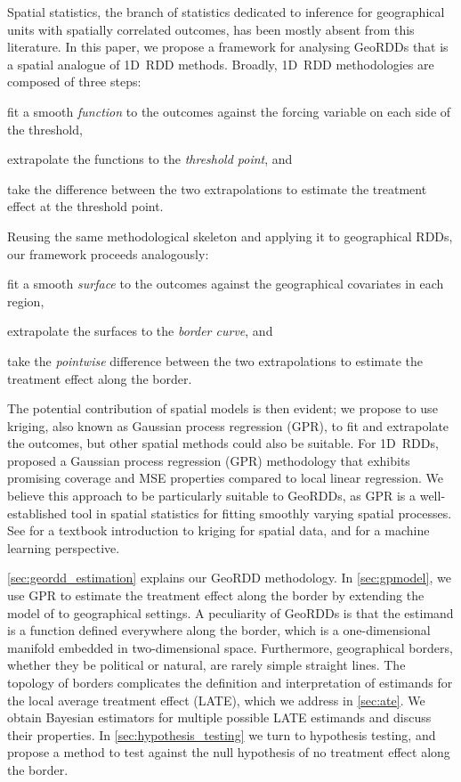 Spatial statistics, the branch of statistics dedicated to inference for geographical units with spatially correlated outcomes, has been mostly absent from this literature.
In this paper, we propose a framework for analysing GeoRDDs that is a spatial analogue of 1D~RDD methods.
Broadly, 1D~RDD methodologies \citep{imbensrdd} are composed of three steps:
\begin{flatlist}
    \item
        fit a smooth \emph{function} to the outcomes against the forcing variable on each side of the threshold,
    \item
        extrapolate the functions to the \emph{threshold point}, and
    \item
        take the difference between the two extrapolations to estimate the treatment effect at the threshold point.
\end{flatlist}
Reusing the same methodological skeleton and applying it to geographical RDDs, our framework proceeds analogously:
\begin{flatlist}
    \item
        fit a smooth \emph{surface} to the outcomes against the geographical covariates in each region,
    \item
        extrapolate the surfaces to the \emph{border curve}, and
    \item
        take the \emph{pointwise} difference between the two extrapolations to estimate the treatment effect along the border.
\end{flatlist}
\label{sec:framework}
The potential contribution of spatial models is then evident;
we propose to use kriging, also known as Gaussian process regression (GPR), to fit and extrapolate the outcomes, 
but other spatial methods could also be suitable.
For 1D~RDDs, \cite{Branson:2017qy} proposed a Gaussian process regression (GPR) methodology that exhibits promising coverage and MSE properties compared to local linear regression.
We believe this approach to be particularly suitable to GeoRDDs, as GPR is a well-established tool in spatial statistics for fitting smoothly varying spatial processes.
See \cite{banerjee2014hierarchical} for a textbook introduction to kriging for spatial data, and \cite{rasmussen2006gaussian} for a machine learning perspective.

\autoref{sec:geordd_estimation} explains our GeoRDD methodology.
In \autoref{sec:gpmodel}, we use GPR to estimate the treatment effect along the border by extending the model of \cite{Branson:2017qy} to geographical settings.
A peculiarity of GeoRDDs is that the estimand is a function defined everywhere along the border, which is a one-dimensional manifold embedded in two-dimensional space.
Furthermore, geographical borders, whether they be political or natural, are rarely simple straight lines.
The topology of borders complicates the definition and interpretation of estimands for the local average treatment effect (LATE), which we address in \autoref{sec:ate}.
We obtain Bayesian estimators for multiple possible LATE estimands and discuss their properties.
In \autoref{sec:hypothesis_testing} we turn to hypothesis testing, and propose a method to test against the null hypothesis of no treatment effect along the border.

